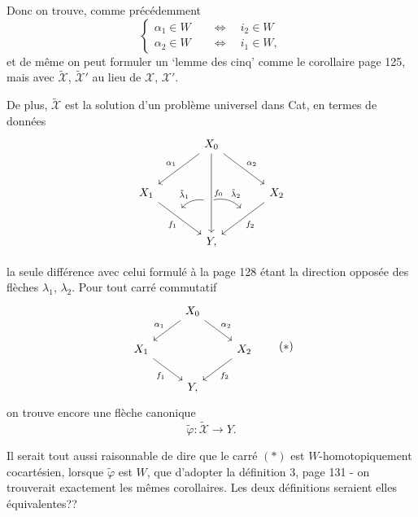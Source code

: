 \documentclass[11pt]{article}
\newcommand{\msp}[1]{\marginpar{\footnotesize [#1]}}
\newcommand{\sX}{\mathscr{X}}
\newcommand{\tX}{\tilde{\mathscr{X}}}
\begin{document}
Donc on trouve, comme précédemment
\[
\left\{
\begin{aligned}
\alpha_1 \in W &\quad\iff\quad i_2 \in W \\
\alpha_2 \in W &\quad\iff\quad i_1 \in W,
\end{aligned}
\right.
\]
et de même on peut formuler un ‘lemme des cinq’ comme le corollaire page 125, mais avec $\tX$, $\tX'$ au lieu de $\sX$, $\sX'$.

De plus, $\tX$ est la solution d'un problème universel dans Cat, en termes de données
\[
\begin{tikzcd}[row sep=large, column sep=large]
 & X_0 \arrow[dl, "\alpha_1"'] \arrow[dr, "\alpha_2"] \arrow[dd, "f_0", ""'{name=G0, pos=0.6}] & \\
X_1 \arrow[dr, "f_1"', ""{name=G1, pos=0.4}] & & X_2 \arrow[dl, "f_2", ""'{name=G2, pos=0.4}] \\
 & Y, &
\arrow[from=G0, to=G1, bend right, "\tilde{\lambda}_1"', shorten <=2pt, shorten >=2pt]
\arrow[from=G0, to=G2, bend left, "\tilde{\lambda}_2", shorten <=2pt, shorten >=2pt]
\end{tikzcd}
\]

\msp{page 136}
la seule différence avec celui formulé à la page 128 étant la direction opposée des flèches $\lambda_1$, $\lambda_2$. Pour tout carré commutatif
\[
\begin{tikzcd}
 & X_0 \arrow[dl, "\alpha_1"'] \arrow[dr, "\alpha_2"] & \\
X_1 \arrow[dr, "f_1"'] & & X_2 \arrow[dl, "f_2"] \\
 & Y, &
\end{tikzcd}
\tag*{$(*)$}
\]
on trouve encore une flèche canonique
\[
\tilde{\varphi} : \tX \longrightarrow Y.
\]

Il serait tout aussi raisonnable de dire que le carré $(*)$ est $W$-homotopiquement cocartésien, lorsque $\tilde{\varphi}$ est $W$, que d'adopter la définition 3, page 131 - on trouverait exactement les mêmes corollaires. Les deux définitions seraient elles équivalentes?? %
\end{document}
